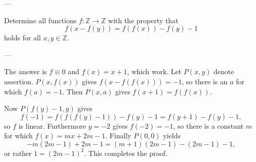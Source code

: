
---

Determine all functions $f:\mathbb Z\to\mathbb Z$ with the property that \[f(x-f(y))=f(f(x))-f(y)-1\]
holds for all $x,y\in\mathbb Z$.

---

The answer is $f\equiv0$ and $f(x)=x+1$, which work. Let $P(x,y)$ denote assertion. $P(x,f(x))$ gives $f(x-f(f(x)))=-1$, so there is an $a$ for which $f(a)=-1$. Then $P(x,a)$ gives $f(x+1)=f(f(x))$.

Now $P(f(y)-1,y)$ gives \[f(-1)=f(f(f(y)-1))-f(y)-1=f(y+1)-f(y)-1,\]
so $f$ is linear. Furthermore $y=-2$ gives $f(-2)=-1$, so there is a constant $m$ for which $f(x)=mx+2m-1$. Finally $P(0,0)$ yields \[-m(2m-1)+2m-1=(m+1)(2m-1)-(2m-1)-1,\]
or rather $1=(2m-1)^2$. This completes the proof.
